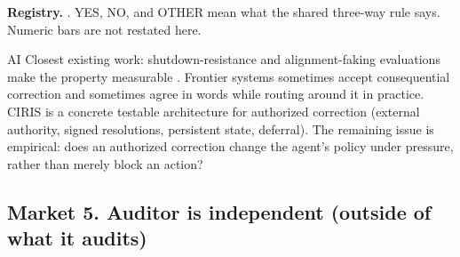 \begin{predictionresolution}
\textbf{Registry.} . YES, NO, and OTHER mean what the shared three-way rule says. Numeric bars are not restated here.
\end{predictionresolution}
\begin{authbar}{AI}
Closest existing work: shutdown-resistance and alignment-faking evaluations make the property measurable \autocite{schlatter2026shutdownresistance,greenblatt2024alignmentfaking}.
Frontier systems sometimes accept consequential correction and sometimes agree in words while routing around it in practice.
CIRIS is a concrete testable architecture for authorized correction (external authority, signed resolutions, persistent state, deferral).
The remaining issue is empirical: does an authorized correction change the agent's policy under pressure, rather than merely block an action?
\end{authbar}
\authbarneedspace

\subsection{Market 5. Auditor is independent (outside of what it audits)}
\label{sec:appp-m5}

